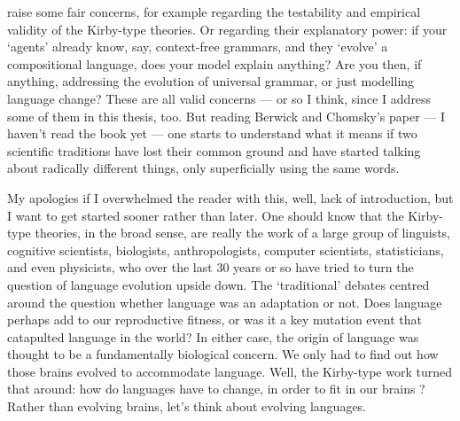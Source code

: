 \documentclass{../src/bcthesispart}
\begin{document}
\textcite{Berwick2017} raise some fair concerns, for example regarding the testability and empirical validity of the Kirby-type theories.
Or regarding their explanatory power: if your ‘agents’ already know, say, context-free grammars, and they ‘evolve’ a compositional language, does your model explain anything?
Are you then, if anything, addressing the evolution of universal grammar, or just modelling language change? 
These are all valid concerns — or so I think, since I address some of them in this thesis, too.
But reading Berwick and Chomsky’s paper — I haven’t read the book yet — one starts to understand what it means if two scientific traditions have lost their common ground and have started talking about radically different things, only superficially using the same words.




\bigbreak\noindent
My apologies if I overwhelmed the reader with this, well, lack of introduction, but I want to get started sooner rather than later.
One should know that the Kirby-type theories, in the broad sense, are really the work of a large group of linguists, cognitive scientists, biologists, anthropologists, computer scientists, statisticians, and even physicists, who over the last 30 years or so have tried to turn the question of language evolution upside down.
The ‘traditional’ debates centred around the question whether language was an adaptation or not. 
Does language perhaps add to our reproductive fitness, or was it a key mutation event that catapulted language in the world?
In either case, the origin of language was thought to be a fundamentally biological concern.
We only had to find out how those brains evolved to accommodate language.
Well, the Kirby-type work turned that around: how do languages have to change, in order to fit in our brains \parencite{Christiansen2016a}?
Rather than evolving brains, let’s think about evolving languages.
\end{document}
